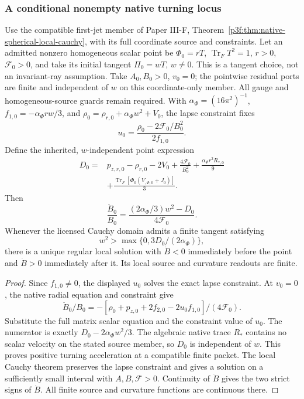 \documentclass[12pt,a4paper]{article}
\begin{document}
\subsubsection{A conditional nonempty native turning locus}
\begin{theorem}
\label{p8:thm:native-local-areal-turning}
Use the compatible first-jet member of Paper III-F,
Theorem~\ref{p3f:thm:native-spherical-local-cauchy}, with its full coordinate
source and constraints. Let an admitted nonzero homogeneous scalar point be
\(\Phi_0=rT\), \(\operatorname{Tr}_F T^2=1\), \(r>0\),
\(\mathscr F_0>0\), and take its initial tangent \(\Pi_0=wT\),
\(w\ne0\). This is a tangent choice, not an invariant-ray assumption.
Take \(A_0,B_0>0\), \(v_0=0\); the pointwise residual ports are finite
and independent of \(w\) on this coordinate-only member. All gauge and
homogeneous-source guards remain required.
With \(\alpha_\Phi=(16\pi^2)^{-1}\),
\(f_{1,0}=-\alpha_\Phi rw/3\), and
\(\rho_0=\rho_{r,0}+\alpha_\Phi w^2+V_0\), the lapse constraint fixes
\begin{equation}
 \boxed{u_0=\frac{\rho_0-2\mathscr F_0/B_0^2}{2f_{1,0}}.}
 \label{p8:eq:native-turning-constraint-data}
\end{equation}
Define the inherited, \(w\)-independent point expression
\begin{equation}
\begin{split}
 D_0={}&p_{z,r,0}-\rho_{r,0}-2V_0+\frac{4\mathscr F_0}{B_0^2}
 +\frac{\alpha_\Phi r^2R_{*,0}}9\\
 &+\frac{\operatorname{Tr}_F[\Phi_0(V_{,\Phi,0}+J_0)]}{3}.
\end{split}
\label{p8:eq:native-turning-point-expression}
\end{equation}
Then
\begin{equation}
 \boxed{\frac{\ddot B_0}{B_0}
 =\frac{(2\alpha_\Phi/3)w^2-D_0}{4\mathscr F_0}.}
 \label{p8:eq:native-turning-acceleration}
\end{equation}
Whenever the licensed Cauchy domain admits a finite tangent satisfying
\[
 \boxed{w^2>\max\{0,3D_0/(2\alpha_\Phi)\},}
\]
there is a unique regular local solution with \(\dot B<0\) immediately
before the point and \(\dot B>0\) immediately after it. Its local source
and curvature readouts are finite.
\end{theorem}
\begin{proof}
Since \(f_{1,0}\ne0\), the displayed \(u_0\) solves the exact lapse
constraint. At \(v_0=0\), the native radial equation and constraint give
\[
 \ddot B_0/B_0
 =-[\rho_0+p_{z,0}+2f_{2,0}-2u_0f_{1,0}]/(4\mathscr F_0).
\]
Substitute the full matrix scalar equation and the constraint value of
\(u_0\). The numerator is exactly
\(D_0-2\alpha_\Phi w^2/3\). The algebraic native trace \(R_*\) contains
no scalar velocity on the stated source member, so \(D_0\) is independent
of \(w\). This proves positive turning acceleration at a compatible
finite packet. The local Cauchy theorem preserves the lapse constraint and
gives a solution on a sufficiently small interval with \(A,B,\mathscr F>0\).
Continuity of \(\ddot B\) gives the two strict signs of \(\dot B\).
All finite source and curvature functions are continuous there.
\end{proof}
\end{document}
